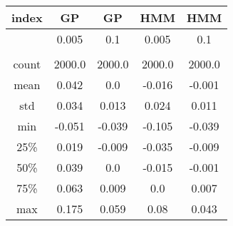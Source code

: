 \centering \begin{tabular}{c|c|c|c|c}
index	&GP	&GP	&HMM	&HMM\\\hline
	&0.005	&0.1	&0.005	&0.1\\
	&	&	&	&\\
count	&2000.0	&2000.0	&2000.0	&2000.0\\
mean	&0.042	&0.0	&-0.016	&-0.001\\
std	&0.034	&0.013	&0.024	&0.011\\
min	&-0.051	&-0.039	&-0.105	&-0.039\\
25\%	&0.019	&-0.009	&-0.035	&-0.009\\
50\%	&0.039	&0.0	&-0.015	&-0.001\\
75\%	&0.063	&0.009	&0.0	&0.007\\
max	&0.175	&0.059	&0.08	&0.043\\
\end{tabular}
